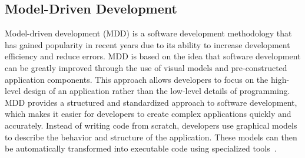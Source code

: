 	\subsection{Model-Driven Development}
	Model-driven development (MDD) is a software development methodology that has gained popularity in recent years due to its ability to increase development efficiency and reduce errors. MDD is based on the idea that software development can be greatly improved through the use of visual models and pre-constructed application components. This approach allows developers to focus on the high-level design of an application rather than the low-level details of programming. MDD provides a structured and standardized approach to software development, which makes it easier for developers to create complex applications quickly and accurately. Instead of writing code from scratch, developers use graphical models to describe the behavior and structure of the application. These models can then be automatically transformed into executable code using specialized tools~\cite{selic2003pragmatics, hailpern2006model}.
	
